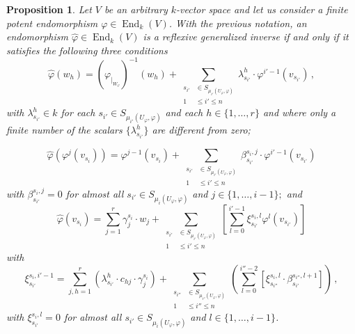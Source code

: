 \documentclass[10pt,a4paper]{amsart}
\newtheorem{prop}[defn]{Proposition}
\theoremstyle{plain}
\theoremstyle{remark}
\numberwithin{equation}{section} \numberwithin{defn}{section}
\newcommand\ed{\operatorname{End}}
\begin{document}
\begin{prop}\cite[Proposition 3.2]{Die-Fpa} \label{P: Char Reflex Fp} Let $V$ be an arbitrary $k$-vector space and let us consider a finite potent endomorphism $\varphi \in \ed_k (V)$. With the previous notation, an endomorphism ${\hat \varphi} \in \ed_k (V)$ is a reflexive generalized inverse if and only if it satisfies the following three conditions \begin{equation} \label{firstldi3yd6d5dh36dd} {\hat \varphi} (w_h) = (\varphi_{\vert_{W_\varphi}})^{-1} (w_h) +  \underset {\begin{aligned} s_{i'} &\in S_{{\mu}_{i'} (U_\varphi, \varphi)} \\ 1 &\leq i' \leq n \end{aligned}} \sum \lambda_{s_{i'}}^h\cdot \varphi^{i'-1} ({ {v_{s_{i'}}}})\, ,\end{equation} \noindent with $\lambda_{s_{i'}}^h\in k$ for each $s_{i'} \in S_{{\mu}_{i'} (U_\varphi, \varphi)}$ and each $h\in \{1, \dots, r\}$ and where only a finite number of the scalars $\{\lambda_{s_{i'}}^h\}$ are different from zero;

\begin{equation} \label{secodn83736yhdudye6} {\hat \varphi} (\varphi^j ({{ v_{s_i}}})) = \varphi^{j-1} ({{ v_{s_i}}}) + \underset {\begin{aligned} s_{i'} &\in S_{{\mu}_{i'} (U_\varphi, \varphi)} \\ 1 &\leq i' \leq n \end{aligned}} \sum \beta_{s_{i'}}^{s_i,j}\cdot \varphi^{i'-1} ({ {v_{s_{i'}}}})\end{equation}\noindent with $\beta_{s_{i'}}^{s_i,j} = 0$ for almost all  $s_{i'} \in S_{{\mu}_i (U_\varphi, \varphi)}$ and $j\in \{1, \dots, i-1\};$
 and \begin{equation} \label{eq:38d76dghydtdg} {\hat \varphi} ({{ v_{s_i}}}) = \sum_{j=1}^r \gamma_j^{s_i}\cdot w_j + \underset {\begin{aligned} s_{i'} &\in S_{{\mu}_{i'} (U_\varphi, \varphi)} \\ 1 &\leq i' \leq n \end{aligned}} \sum [\sum_{l=0}^{i'-1} \xi_{s_{i'}}^{s_i,l} \varphi^{l} ({{v_{s_{i'}}}})]\end{equation} \noindent with \begin{equation} \label{eq:8d7hdyjdikdjnd} \xi_{s_{i'}}^{s_i,i'-1} = \sum_{j,h=1}^r (\lambda_{s_{i'}}^h \cdot c_{hj} \cdot \gamma_j^{s_i}) + \underset {\begin{aligned} s_{i''} &\in S_{{\mu}_{i''} (U_\varphi, \varphi)} \\ 1 &\leq i'' \leq n \end{aligned}} \sum {( \sum_{l=0}^{i''-2} [\xi_{s_{i''}}^{s_i,l} \cdot \beta_{s_{i'}}^{s_{i''},l+1}] )}\, ,\end{equation}\noindent with  $\xi_{s_{i'}}^{s_i,l} = 0$ for almost all  $s_{i'} \in S_{{\mu}_i (U_\varphi, \varphi)}$ and $l\in \{1, \dots, i-1\}$.
\end{prop}
\end{document}
